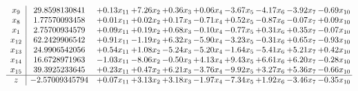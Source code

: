 \documentclass[9pt]{article}
\begin{document}
\[\begin{array}{c| c c@{\hskip 2pt} c@{\hskip 2pt} c@{\hskip 2pt} c@{\hskip 2pt} c@{\hskip 2pt} c@{\hskip 2pt} c@{\hskip 2pt} c@{\hskip 2pt} }
 x_{9}   &  29.8598130841 & +  0.13 x_{11} & +  7.26 x_{2} & +  0.36 x_{3} & +  0.06 x_{4} & -3.67 x_{5} & -4.17 x_{6} & -3.92 x_{7} & -0.69 x_{10}\\
 x_{8}   &  1.77570093458 & +  0.01 x_{11} & +  0.02 x_{2} & +  0.17 x_{3} & -0.71 x_{4} & +  0.52 x_{5} & -0.87 x_{6} & -0.07 x_{7} & +  0.09 x_{10}\\
 x_{1}   &  2.75700934579 & +  0.09 x_{11} & +  0.19 x_{2} & +  0.68 x_{3} & -0.10 x_{4} & -0.77 x_{5} & +  0.31 x_{6} & +  0.35 x_{7} & -0.07 x_{10}\\
 x_{12}   &  62.2429906542 & +  0.91 x_{11} & -1.19 x_{2} & +  6.32 x_{3} & -5.90 x_{4} & -3.23 x_{5} & -0.31 x_{6} & +  0.65 x_{7} & -0.93 x_{10}\\
 x_{13}   &  24.9906542056 & +  0.54 x_{11} & +  1.08 x_{2} & -5.24 x_{3} & -5.20 x_{4} & -1.64 x_{5} & -5.41 x_{6} & +  5.21 x_{7} & +  0.42 x_{10}\\
 x_{14}   &  16.6728971963 & -1.03 x_{11} & -8.06 x_{2} & -0.50 x_{3} & +  4.13 x_{4} & +  9.43 x_{5} & +  6.61 x_{6} & +  6.20 x_{7} & -0.28 x_{10}\\
 x_{15}   &  39.3925233645 & +  0.23 x_{11} & +  0.47 x_{2} & +  6.21 x_{3} & -3.76 x_{4} & -9.92 x_{5} & +  3.27 x_{6} & +  5.36 x_{7} & -0.66 x_{10}\\
\hline
z    &  -2.57009345794 & +  0.07 x_{11} & +  3.13 x_{2} & +  3.18 x_{3} & -1.97 x_{4} & -7.34 x_{5} & +  1.92 x_{6} & -3.46 x_{7} & -0.35 x_{10}\\
\end{array}\]
\end{document}
